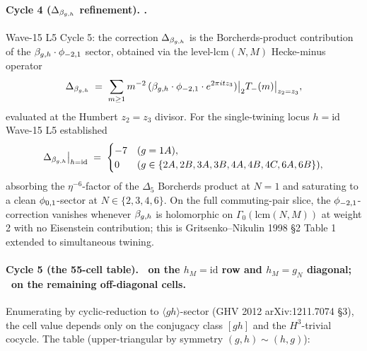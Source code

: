 \paragraph{Cycle 4 ($\Delta_{\beta_{g,h}}$ refinement). \ClaimStatusTheorem.}
Wave-15 L5 Cycle 5: the correction $\Delta_{\beta_{g,h}}$ is the
Borcherds-product contribution of the $\beta_{g,h} \cdot \phi_{-2,1}$ sector,
obtained via the level-$\mathrm{lcm}(N,M)$ Hecke-minus operator
\[
  \Delta_{\beta_{g,h}} \;=\; \sum_{m \ge 1} m^{-2}\,
    (\beta_{g,h} \cdot \phi_{-2,1} \cdot e^{2\pi i t z_3})
    \big|_2 T_-(m) \big|_{z_2 = z_3},
\]
evaluated at the Humbert $z_2 = z_3$ divisor. For the single-twining
locus $h = \mathrm{id}$ Wave-15 L5 established
\[
  \Delta_{\beta_{g,h}}\big|_{h=\mathrm{id}} \;=\;
  \begin{cases}
    -7 & (g = 1A),\\
    0 & (g \in \{2A, 2B, 3A, 3B, 4A, 4B, 4C, 6A, 6B\}),
  \end{cases}
\]
absorbing the $\eta^{-6}$-factor of the $\Delta_5$ Borcherds product
at $N=1$ and saturating to a clean $\phi_{0,1}$-sector at $N \in \{2,3,4,6\}$.
On the full commuting-pair slice, the $\phi_{-2,1}$-correction vanishes
whenever $\beta_{g,h}$ is holomorphic on $\Gamma_0(\mathrm{lcm}(N,M))$ at
weight 2 with no Eisenstein contribution; this is Gritsenko--Nikulin
1998 \S 2 Table 1 extended to simultaneous twining.

\paragraph{Cycle 5 (the 55-cell table). \ClaimStatusTheorem\ on the
$h_M = \mathrm{id}$ row and $h_M = g_N$ diagonal; \ClaimStatusConjectured\
on the remaining off-diagonal cells.}
Enumerating by cyclic-reduction to $\langle gh \rangle$-sector
(GHV 2012 arXiv:1211.7074 \S 3), the cell value depends only on the
conjugacy class $[gh]$ and the $H^3$-trivial cocycle. The table
(upper-triangular by symmetry $(g,h) \sim (h,g)$):

